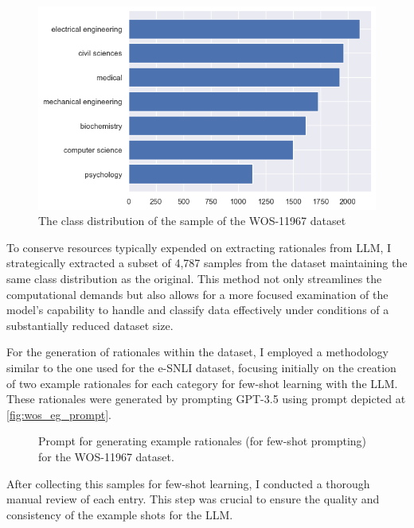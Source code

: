 \begin{figure}[hbt]
    \centering
    \includegraphics[width=0.8\linewidth]{figs/wos_distrib.png}
    \caption{The class distribution of the sample of the WOS-11967 dataset}
    \label{fig:wos_distrib}
\end{figure}

To conserve resources typically expended on extracting rationales from LLM, I strategically extracted a subset of 4,787 samples from the dataset maintaining the same class distribution as the original. This method not only streamlines the computational demands but also allows for a more focused examination of the model's capability to handle and classify data effectively under conditions of a substantially reduced dataset size.

For the generation of rationales within the dataset, I employed a methodology similar to the one used for the e-SNLI dataset, focusing initially on the creation of two example rationales for each category for few-shot learning with the LLM\@. These rationales were generated by prompting GPT-3.5 using prompt depicted at \autoref{fig:wos_eg_prompt}.

\begin{figure}[ht!]
    \centering
    
    \caption{Prompt for generating example rationales (for few-shot prompting) for the WOS-11967 dataset.}
    \label{fig:wos_eg_prompt}
\end{figure}

After collecting this samples for few-shot learning, I conducted a thorough manual review of each entry. This step was crucial to ensure the quality and consistency of the example shots for the LLM\@.


